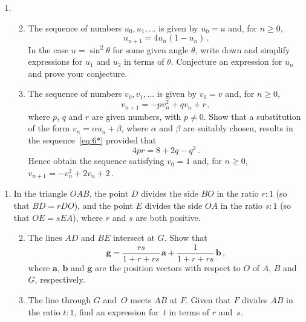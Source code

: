 \documentclass[a4, 11pt]{report}
\newlength{\qspace}
\newcounter{qnumber}
\newenvironment{question}%
 {\vspace{\qspace}
  \begin{enumerate}[\bfseries 1\quad][10]%
    \setcounter{enumi}{\value{qnumber}}%
    \item%
 }
{
  \end{enumerate}
  \filbreak
  \stepcounter{qnumber}
 }
\newenvironment{questionparts}[1][1]%
 {
  \begin{enumerate}[\bfseries (i)]%
    \setcounter{enumii}{#1}
    \addtocounter{enumii}{-1}
    \setlength{\itemsep}{5mm}
    \setlength{\parskip}{8pt}
 }
 {
  \end{enumerate}
 }
\def\ge{\geqslant}
\renewcommand{\.}[1]{\ensuremath{\mathrm{#1}}}
\newcommand{\+}[1]{\ensuremath{\mathbf{#1}}}
\begin{document}
\begin{question}
  \begin{questionparts}
  \item The sequence of numbers $u_0, u_1, \ldots $ is given by
    $u_0=u$ and, for $n\ge 0$,
    \begin{equation}
      \label{eq:6*}
      u_{n+1} =4u_n(1- u_n)\,.
      \tag{$*$}
    \end{equation}
    In the case $u= \sin^2\theta$ for some given angle $\theta$, write
    down and simplify expressions for $u_1$ and $u_2$ in terms of
    $\theta$. Conjecture an expression for $u_n$ and prove your
    conjecture.

  \item The sequence of numbers $v_0, v_1, \ldots $ is given by $v_0=
    v$ and, for $n\ge 0$,
    \[
    v_{n+1} = -pv_n^2 +qv_n +r\,,
    \]
    where $p$, $q$ and $r$ are given numbers, with $p\ne0$. Show that
    a substitution of the form $v_n =\alpha u_n +\beta$, where
    $\alpha$ and $\beta$ are suitably chosen, results in the
    sequence~\eqref{eq:6*} provided that
    \[
    4pr = 8 +2q -q^2 \,.
    \]
    Hence obtain the sequence satisfying
    $v_0=1$ and, for $n\ge0$, $v_{n+1} = -v_n^2 +2 v_n +2 \,$.
  \end{questionparts}
\end{question}
	
\begin{question}
  In the triangle $OAB$, the point $D$ divides the side $BO$ in the
  ratio $r:1$ (so that $BD = rDO$), and the point $E$ divides the
  side $OA$ in the ratio $s:1$ (so that $OE =s EA$), 
where $r$ and $s$ are both positive.  
  \begin{questionparts}
  \item 
The lines $AD$ and $BE$ intersect at
 $G$. 
Show that  
    \[
\+g=    \frac{rs}{1+r+rs} \, \+a + \frac 1 {1+r+rs} \, \+b \,,
    \]
    where \+a, \+b and \+g are the position vectors with respect to
$O$ of $A$, $B$ and $G$,
    respectively.                       
  \item 
The line through $G$ and~$O$ meets $AB$ at
 $F$.
Given that $F$ divides $AB$ in the ratio $t:1$, find an
    expression for~$t$ in terms of $r$ and~$s$. 
    
  \end{questionparts}  
\end{question}
		
\end{document}
